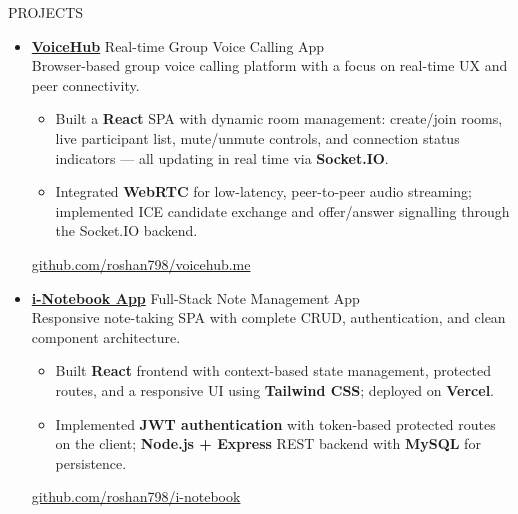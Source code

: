 \documentclass{resume}
\begin{document}
\begin{rSection}{PROJECTS}
\begin{itemize}
\item \href{https://github.com/roshan798/voicehub.me}{\textbf{VoiceHub}}
  \hfill Real-time Group Voice Calling App\\
  Browser-based group voice calling platform with a focus on real-time UX
  and peer connectivity.
  \begin{itemize}
    \itemsep -3pt
    \item Built a \textbf{React} SPA with dynamic room management: create/join
          rooms, live participant list, mute/unmute controls, and connection
          status indicators --- all updating in real time via \textbf{Socket.IO}.
    \item Integrated \textbf{WebRTC} for low-latency, peer-to-peer audio
          streaming; implemented ICE candidate exchange and offer/answer
          signalling through the Socket.IO backend.
  \end{itemize}
  \href{https://github.com/roshan798/voicehub.me}{github.com/roshan798/voicehub.me}

\item \href{https://i-notebook-app-nine.vercel.app/}{\textbf{i-Notebook App}}
  \hfill Full-Stack Note Management App\\
  Responsive note-taking SPA with complete CRUD, authentication, and
  clean component architecture.
  \begin{itemize}
    \itemsep -3pt
    \item Built \textbf{React} frontend with context-based state management,
          protected routes, and a responsive UI using \textbf{Tailwind CSS};
          deployed on \textbf{Vercel}.
    \item Implemented \textbf{JWT authentication} with token-based protected
          routes on the client; \textbf{Node.js + Express} REST backend with
          \textbf{MySQL} for persistence.
  \end{itemize}
  \href{https://github.com/roshan798/i-notebook-app}{github.com/roshan798/i-notebook}

\end{itemize}
\end{rSection}
\end{document}
